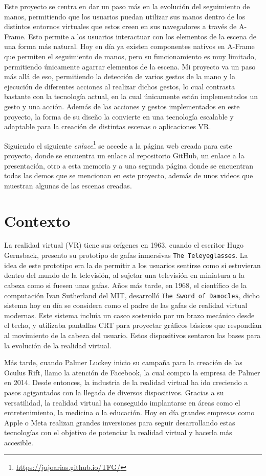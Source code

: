 \documentclass[a4paper, 12pt]{book}
\begin{document}
Este proyecto se centra en dar un paso más en la evolución del seguimiento de manos, permitiendo que los usuarios puedan utilizar sus manos dentro de los distintos entornos virtuales que estos creen en sus navegadores a través de A-Frame. 
Esto permite a los usuarios interactuar con los elementos de la escena de una forma más natural. Hoy en día ya existen componentes nativos en A-Frame que permiten el seguimiento de manos, pero su funcionamiento es muy limitado, permitiendo únicamente agarrar elementos de la escena.
Mi proyecto va un paso más allá de eso, permitiendo la detección de varios gestos de la mano y la ejecución de diferentes acciones al realizar dichos gestos, lo cual contrasta bastante con la tecnología actual, en la cual únicamente están implementados un gesto y una acción.
Además de las acciones y gestos implementados en este proyecto, la forma de su diseño la convierte en una tecnología escalable y adaptable para la creación de distintas escenas o aplicaciones VR. 

Siguiendo el siguiente \textit{enlace}\footnote{\url{https://jujoarias.github.io/TFG/}} se accede a la página web creada para este proyecto, donde se encuentra un enlace al repositorio GitHub, un enlace a la presentación, otro a esta memoria y a una segunda página donde se encuentran todas las demos que se mencionan en este proyecto, además de unos videos que muestran algunas de las escenas creadas.

\section{Contexto}
\label{sec:contexto}
La realidad virtual (VR) tiene sus orígenes en 1963, cuando el escritor Hugo Gernsback, presento su prototipo de gafas inmersivas \texttt{The Teleyeglasses}. La idea de este prototipo era la de permitir a los usuarios sentirse como si estuvieran dentro del mundo de la televisión, al sujetar una televisión en miniatura a la cabeza como si fuesen unas gafas. Años más tarde, en 1968, el científico de la computación Ivan Sutherland del MIT,
desarrolló \texttt{The Sword of Damocles}, dicho sistema hoy en día se considera como el padre de las gafas de realidad virtual modernas. Este sistema incluía un casco sostenido por un brazo mecánico desde el techo, y utilizaba pantallas CRT para proyectar gráficos básicos que respondían al movimiento de la cabeza del usuario.
Estos dispositivos sentaron las bases para la evolución de la realidad virtual. 

Más tarde, cuando Palmer Luckey inicio su campaña para la creación de las Oculus Rift, llamo la atención de Facebook, la cual compro la empresa de Palmer en 2014. Desde entonces, la industria de la realidad virtual ha ido creciendo a pasos agigantados con la llegada de diversos dispositivos. Gracias a su versatilidad, la realidad virtual ha conseguido implantarse en áreas como el entretenimiento, la medicina o la educación. Hoy en día grandes empresas como Apple o Meta 
realizan grandes inversiones para seguir desarrollando estas tecnologías con el objetivo de potenciar la realidad virtual y hacerla más accesible.  
\end{document}

